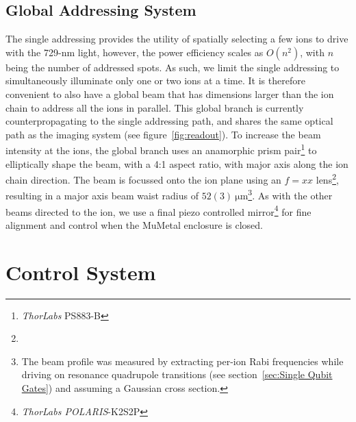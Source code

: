 
\subsection{Global Addressing System}
\label{sec:Global Addressing System}
The single addressing provides the utility of spatially selecting a few ions to
drive with the 729-nm light, however, the power efficiency scales as $O(n^2)$,
with $n$ being the number of addressed spots. As such, we limit the single addressing to simultaneously illuminate only one or two ions at a time. It is therefore convenient to also
have a global beam that has dimensions larger than the ion chain to address all the ions in parallel. This global branch is currently counterpropagating to the single addressing path, and shares the same optical path as the imaging system (see figure~\ref{fig:readout}). To increase
the beam intensity at the ions, the global branch uses an anamorphic prism
pair\footnote{\emph{ThorLabs} PS883-B} to elliptically shape the beam, with a
4:1 aspect ratio, with major axis along the ion chain direction.  The beam is focussed onto the ion plane using an $f=xx$ lens\footnote{}, resulting
in a major axis beam waist radius of $52(3)~\unit{\micro\meter}$\footnote{The
beam profile was measured by extracting per-ion Rabi frequencies while driving
on resonance quadrupole transitions (see section~\ref{sec:Single Qubit Gates}) and
assuming a Gaussian
cross section.}. As with the other beams directed to the ion, we use a final piezo controlled mirror\footnote{\emph{ThorLabs POLARIS}-K2S2P} for fine alignment and control when the MuMetal enclosure is closed.

\section{Control System}

